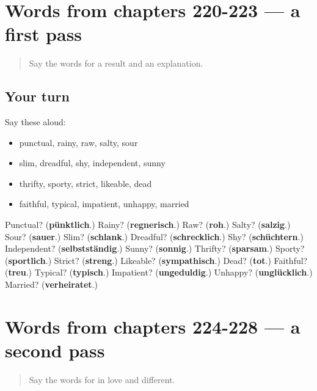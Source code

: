 \section[(dialogue)]{Words from chapters 220-223 — a first pass}

\label{lesson:GE-R228-first-pass-words-from-chapters-220-223}



\begin{quote}
Say the words for a result and an explanation.
\end{quote}

\subsection*{Your turn}
Say these aloud:

\begin{itemize}
\raggedright
  \item punctual, rainy, raw, salty, sour
  \item slim, dreadful, shy, independent, sunny
  \item thrifty, sporty, strict, likeable, dead
  \item faithful, typical, impatient, unhappy, married
\end{itemize}

\begin{tcolorbox}[breakable,colback=teal!4,colframe=teal!35!black,title={Before you move on}]
Punctual? (\textbf{pünktlich}.) Rainy? (\textbf{regnerisch}.) Raw? (\textbf{roh}.) Salty? (\textbf{salzig}.) Sour? (\textbf{sauer}.) Slim? (\textbf{schlank}.) Dreadful? (\textbf{schrecklich}.) Shy? (\textbf{schüchtern}.) Independent? (\textbf{selbstständig}.) Sunny? (\textbf{sonnig}.) Thrifty? (\textbf{sparsam}.) Sporty? (\textbf{sportlich}.) Strict? (\textbf{streng}.) Likeable? (\textbf{sympathisch}.) Dead? (\textbf{tot}.) Faithful? (\textbf{treu}.) Typical? (\textbf{typisch}.) Impatient? (\textbf{ungeduldig}.) Unhappy? (\textbf{unglücklich}.) Married? (\textbf{verheiratet}.)
\end{tcolorbox}
\section[(dialogue)]{Words from chapters 224-228 — a second pass}

\label{lesson:GE-R228-second-pass-words-from-chapters-224-228}



\begin{quote}
Say the words for in love and different.
\end{quote}

